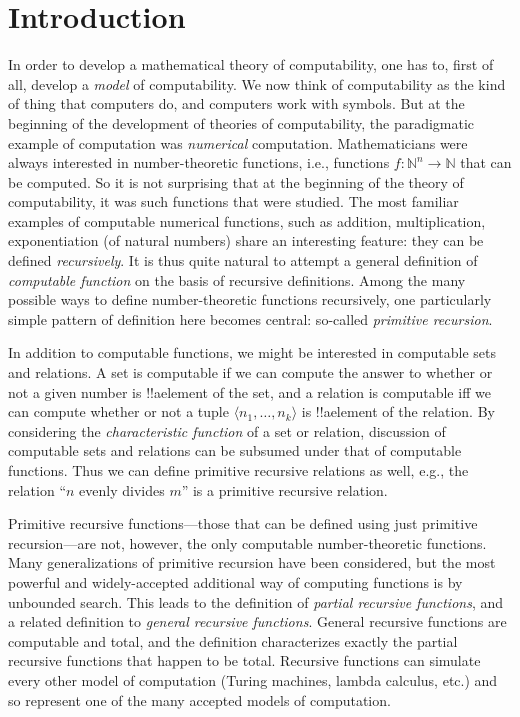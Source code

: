 \documentclass[10pt,a4paper]{article}
\theoremstyle{plain}
\theoremstyle{definition}
\theoremstyle{remark}
\newcommand*{\olfileid}[3]{}
\newcommand*{\olsection}[1]{\section*{#1}}
\providecommand{\tuple}[1]{\langle #1 \rangle}
\providecommand{\Nat}{\ensuremath{\mathbb{N}}}
\begin{document}



\olfileid{cmp}{rec}{int}
\olsection{Introduction}

In order to develop a mathematical theory of computability, one has to,
first of all, develop a \emph{model} of computability.  We now think of
computability as the kind of thing that computers do, and computers
work with symbols.  But at the beginning of the development of
theories of computability, the paradigmatic example of computation was
\emph{numerical} computation.  Mathematicians were always interested
in number-theoretic functions, i.e., functions $f\colon \Nat^n \to
\Nat$ that can be computed. So it is not surprising that at the
beginning of the theory of computability, it was such functions that
were studied.  The most familiar examples of computable numerical
functions, such as addition, multiplication, exponentiation (of
natural numbers) share an interesting feature: they can be defined
\emph{recursively}.  It is thus quite natural to attempt a general
definition of \emph{computable function} on the basis of recursive
definitions.  Among the many possible ways to define number-theoretic
functions recursively, one particularly simple pattern of definition
here becomes central: so-called \emph{primitive recursion}.

In addition to computable functions, we might be interested in
computable sets and relations. A set is computable if we can compute
the answer to whether or not a given number is !!a{element} of the
set, and a relation is computable iff we can compute whether or not a
tuple $\tuple{n_1, \dots, n_k}$ is !!a{element} of the relation.  By
considering the \emph{characteristic function} of a set or relation,
discussion of computable sets and relations can be subsumed under that
of computable functions.  Thus we can define primitive recursive
relations as well, e.g., the relation ``$n$ evenly divides $m$'' is a
primitive recursive relation.

Primitive recursive functions---those that can be defined using just
primitive recursion---are not, however, the only computable
number-theoretic functions. Many generalizations of primitive
recursion have been considered, but the most powerful and
widely-accepted additional way of computing functions is by unbounded
search.  This leads to the definition of \emph{partial recursive
  functions}, and a related definition to \emph{general recursive
  functions}.  General recursive functions are computable and total,
and the definition characterizes exactly the partial recursive
functions that happen to be total.  Recursive functions can simulate
every other model of computation (Turing machines, lambda calculus,
etc.) and so represent one of the many accepted models of computation.
\end{document}
